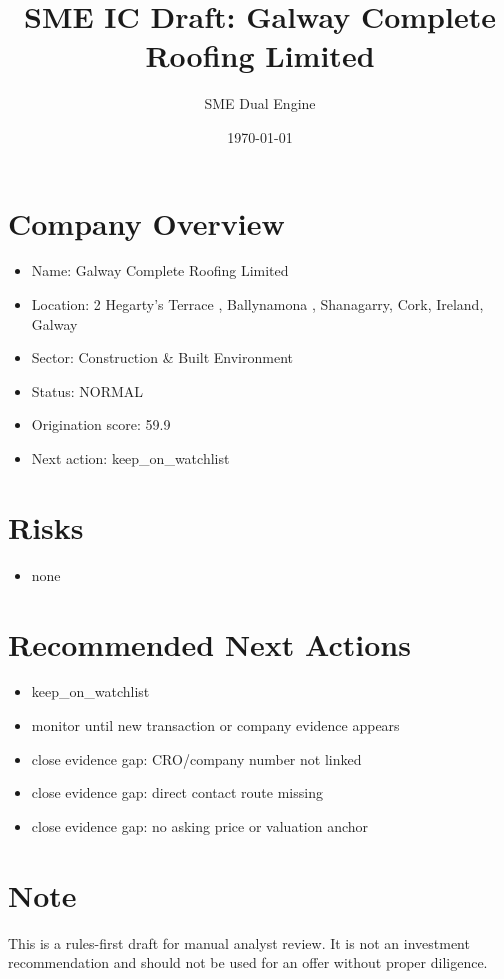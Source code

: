 \documentclass[11pt,a4paper]{article}
\title{SME IC Draft: Galway Complete Roofing Limited}
\author{SME Dual Engine}
\date{\today}
\begin{document}
\maketitle
\section*{Company Overview}
\begin{itemize}[leftmargin=1.4em]
\item Name: Galway Complete Roofing Limited
\item Location: 2 Hegarty's Terrace , Ballynamona , Shanagarry, Cork, Ireland, Galway
\item Sector: Construction \& Built Environment
\item Status: NORMAL
\item Origination score: 59.9
\item Next action: keep\_on\_watchlist
\end{itemize}
\section*{Risks}
\begin{itemize}[leftmargin=1.4em]
\item none
\end{itemize}
\section*{Recommended Next Actions}
\begin{itemize}[leftmargin=1.4em]
\item keep\_on\_watchlist
\item monitor until new transaction or company evidence appears
\item close evidence gap: CRO/company number not linked
\item close evidence gap: direct contact route missing
\item close evidence gap: no asking price or valuation anchor
\end{itemize}
\section*{Note}
This is a rules-first draft for manual analyst review. It is not an investment
recommendation and should not be used for an offer without proper diligence.
\end{document}
